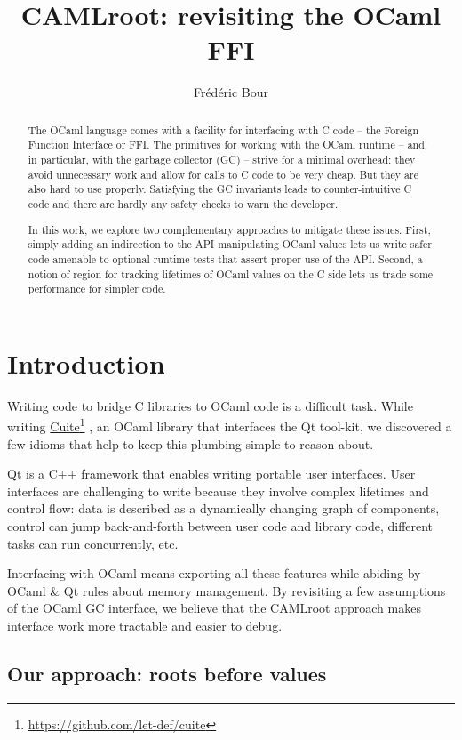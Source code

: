 \documentclass[a4paper]{easychair}
\title{CAMLroot: revisiting the OCaml FFI}
\author{
  Frédéric Bour
}
\institute{
}
\newcommand\fnurl[2]{%
\href{#2}{#1}\footnote{\url{#2}}%
}
\begin{document}
\maketitle

\begin{abstract}
The OCaml language comes with a facility for interfacing with C code -- the Foreign Function Interface or FFI. The primitives for working with the OCaml runtime -- and, in particular, with the garbage collector (GC) -- strive for a minimal overhead: they avoid unnecessary work and allow for calls to C code to be very cheap. But they are also hard to use properly. Satisfying the GC invariants leads to counter-intuitive C code and there are hardly any safety checks to warn the developer.

In this work, we explore two complementary approaches to mitigate these issues. First, simply adding an indirection to the API manipulating OCaml values lets us write safer code amenable to optional runtime tests that assert proper use of the API. Second, a notion of region for tracking lifetimes of OCaml values on the C side lets us trade some performance for simpler code.
\end{abstract}

\section{Introduction}

Writing code to bridge C libraries to OCaml code is a difficult task.
While writing \fnurl{Cuite}{https://github.com/let-def/cuite}, an OCaml
library that interfaces the Qt tool-kit, we discovered a few idioms that
help to keep this plumbing simple to reason about.

Qt is a C++ framework that enables writing portable user interfaces.
User interfaces are challenging to write because they involve complex
lifetimes and control flow: data is described as a dynamically changing
graph of components, control can jump back-and-forth between user code
and library code, different tasks can run concurrently, etc.

Interfacing with OCaml means exporting all these features while abiding
by OCaml \& Qt rules about memory management. By revisiting a few
assumptions of the OCaml GC interface, we believe that the CAMLroot 
approach makes interface work more tractable and easier to debug.

\subsection{Our approach: roots before values}
\end{document}

